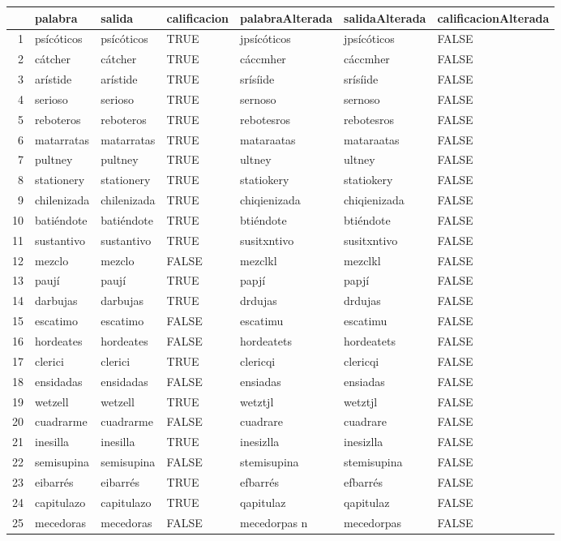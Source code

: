 \documentclass[paper=letter, fontsize=11pt]{scrartcl}
\numberwithin{equation}{section} %
\numberwithin{figure}{section} %
\numberwithin{table}{section} %
\begin{document}
\begin{table}[ht]
\centering
\begin{tabular}{rllllll}
  \hline
 & palabra & salida & calificacion & palabraAlterada & salidaAlterada & calificacionAlterada \\ 
  \hline
1 & psícóticos & psícóticos & TRUE & jpsícóticos & jpsícóticos & FALSE \\ 
  2 & cátcher & cátcher & TRUE & cáccmher & cáccmher & FALSE \\ 
  3 & arístide & arístide & TRUE & srísíide & srísíide & FALSE \\ 
  4 & serioso & serioso & TRUE & sernoso & sernoso & FALSE \\ 
  5 & reboteros & reboteros & TRUE & rebotesros & rebotesros & FALSE \\ 
  6 & matarratas & matarratas & TRUE & mataraatas & mataraatas & FALSE \\ 
  7 & pultney & pultney & TRUE & ultney & ultney & FALSE \\ 
  8 & stationery & stationery & TRUE & statiokery & statiokery & FALSE \\ 
  9 & chilenizada & chilenizada & TRUE & chiqienizada & chiqienizada & FALSE \\ 
  10 & batiéndote & batiéndote & TRUE & btiéndote & btiéndote & FALSE \\ 
  11 & sustantivo & sustantivo & TRUE & susitxntivo & susitxntivo & FALSE \\ 
  12 & mezclo  & mezclo & FALSE & mezclkl  & mezclkl & FALSE \\ 
  13 & paují & paují & TRUE & papjí & papjí & FALSE \\ 
  14 & darbujas & darbujas & TRUE & drdujas & drdujas & FALSE \\ 
  15 & escatimo  & escatimo & FALSE & escatimu  & escatimu & FALSE \\ 
  16 & hordeates  & hordeates & FALSE & hordeatets  & hordeatets & FALSE \\ 
  17 & clerici & clerici & TRUE & clericqi & clericqi & FALSE \\ 
  18 & ensidadas  & ensidadas & FALSE & ensiadas  & ensiadas & FALSE \\ 
  19 & wetzell & wetzell & TRUE & wetztjl & wetztjl & FALSE \\ 
  20 & cuadrarme  & cuadrarme & FALSE & cuadrare  & cuadrare & FALSE \\ 
  21 & inesilla & inesilla & TRUE & inesizlla & inesizlla & FALSE \\ 
  22 & semisupina  & semisupina & FALSE & stemisupina  & stemisupina & FALSE \\ 
  23 & eibarrés & eibarrés & TRUE & efbarrés & efbarrés & FALSE \\ 
  24 & capitulazo & capitulazo & TRUE & qapitulaz & qapitulaz & FALSE \\ 
  25 & mecedoras   & mecedoras & FALSE & mecedorpas n & mecedorpas & FALSE \\ 
   \hline
\end{tabular}
\end{table}
\FloatBarrier
\end{document}

